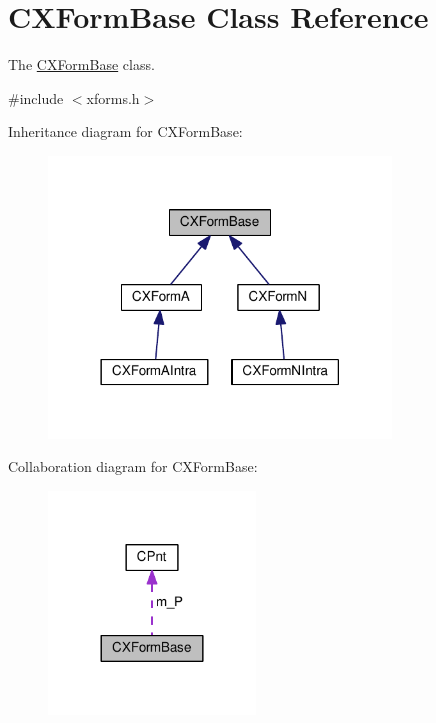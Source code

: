 \hypertarget{classCXFormBase}{\section{C\-X\-Form\-Base Class Reference}
\label{classCXFormBase}
}


The \hyperlink{classCXFormBase}{C\-X\-Form\-Base} class.  




{\ttfamily \#include $<$xforms.\-h$>$}



Inheritance diagram for C\-X\-Form\-Base\-:\nopagebreak
\begin{figure}[H]
\begin{center}
\leavevmode
\includegraphics[width=258pt]{classCXFormBase__inherit__graph}
\end{center}
\end{figure}


Collaboration diagram for C\-X\-Form\-Base\-:\nopagebreak
\begin{figure}[H]
\begin{center}
\leavevmode
\includegraphics[width=156pt]{classCXFormBase__coll__graph}
\end{center}
\end{figure}
